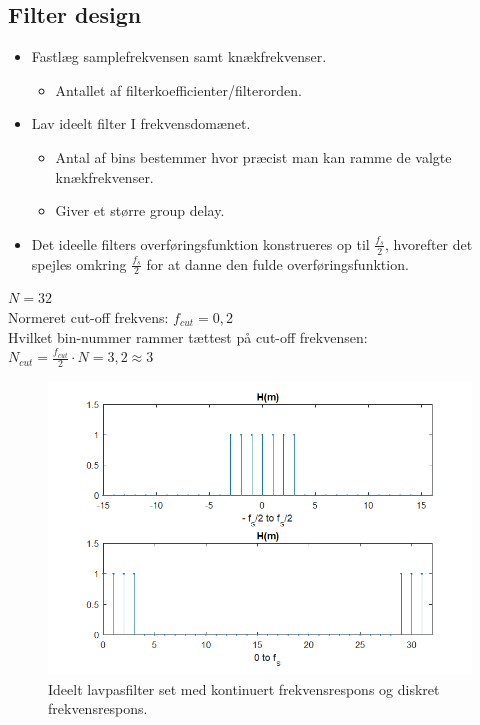 \documentclass[danish]{article}
\begin{document}
\subsection{Filter design}
\begin{itemize}
	\item Fastlæg samplefrekvensen samt knækfrekvenser.
	\begin{itemize}
		\item Antallet af filterkoefficienter/filterorden.
	\end{itemize}
	\item Lav ideelt filter I frekvensdomænet.
	\begin{itemize}
		\item Antal af bins bestemmer hvor præcist man kan ramme de valgte knækfrekvenser.
		\item Giver et større group delay. 
	\end{itemize}
	\item Det ideelle filters overføringsfunktion konstrueres op til $\frac{f_s}{2}$, hvorefter det spejles omkring $\frac{f_s}{2}$ for at danne den fulde overføringsfunktion. 
\end{itemize}

$N = 32$\\
\newline Normeret cut-off frekvens: $f_{cut} = 0,2$\\
\newline Hvilket bin-nummer rammer tættest på cut-off frekvensen: $N_{cut} = \frac{f_{cut}}{2}\cdot N = 3,2 \approx 3$\\

\begin{figure}[H]
	\centering
	\includegraphics[width=0.6\linewidth]{graphics/windowmethod_1}
	\caption{Ideelt lavpasfilter set med kontinuert frekvensrespons og diskret frekvensrespons.}
	\label{fig:windowmethod_1}
\end{figure}
\end{document}
